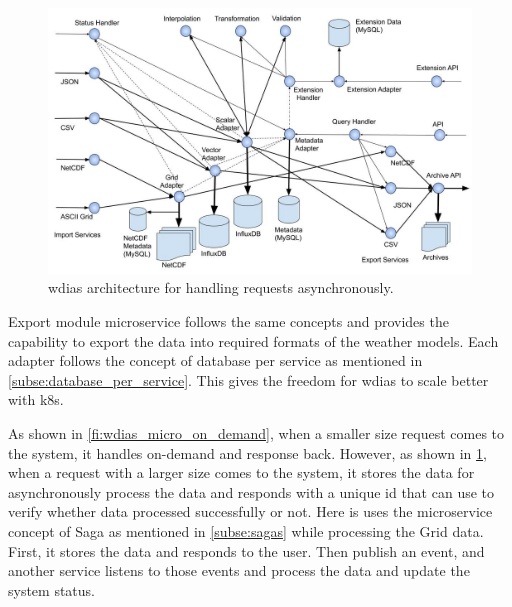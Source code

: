 \begin{figure}[htp]
    \centering
    \includegraphics[width=1\textwidth]{method/microservice/microservice_architecture-handle_on_async-v3.jpg}
    \caption{\acrshort{wdias} architecture for handling requests asynchronously.}
    \label{fi:wdias_micro_async}
\end{figure}
Export module microservice follows the same concepts and provides the capability to export the data into required formats of the weather models. Each adapter follows the concept of database per service as mentioned in \cref{subse:database_per_service}. This gives the freedom for \acrshort{wdias} to scale better with \acrshort{k8s}.

As shown in \cref{fi:wdias_micro_on_demand}, when a smaller size request comes to the system, it handles on-demand and response back. However, as shown in \cref{fi:wdias_micro_async}, when a request with a larger size comes to the system, it stores the data for asynchronously process the data and responds with a unique id that can use to verify whether data processed successfully or not. Here is uses the microservice concept of Saga as mentioned in \cref{subse:sagas} while processing the Grid data. First, it stores the data and responds to the user. Then publish an event, and another service listens to those events and process the data and update the system status.

